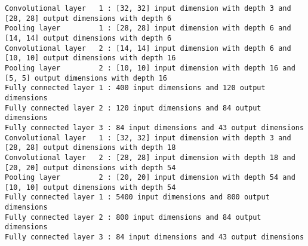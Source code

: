 \documentclass[11pt]{article}
\begin{document}
    \begin{Verbatim}[commandchars=\\\{\}]
Convolutional layer   1 : [32, 32] input dimension with depth 3 and [28, 28] output dimensions with depth 6
Pooling layer         1 : [28, 28] input dimension with depth 6 and [14, 14] output dimensions with depth 6
Convolutional layer   2 : [14, 14] input dimension with depth 6 and [10, 10] output dimensions with depth 16
Pooling layer         2 : [10, 10] input dimension with depth 16 and [5, 5] output dimensions with depth 16
Fully connected layer 1 : 400 input dimensions and 120 output dimensions
Fully connected layer 2 : 120 input dimensions and 84 output dimensions
Fully connected layer 3 : 84 input dimensions and 43 output dimensions
Convolutional layer   1 : [32, 32] input dimension with depth 3 and [28, 28] output dimensions with depth 18
Convolutional layer   2 : [28, 28] input dimension with depth 18 and [20, 20] output dimensions with depth 54
Pooling layer         2 : [20, 20] input dimension with depth 54 and [10, 10] output dimensions with depth 54
Fully connected layer 1 : 5400 input dimensions and 800 output dimensions
Fully connected layer 2 : 800 input dimensions and 84 output dimensions
Fully connected layer 3 : 84 input dimensions and 43 output dimensions

    \end{Verbatim}
\end{document}
